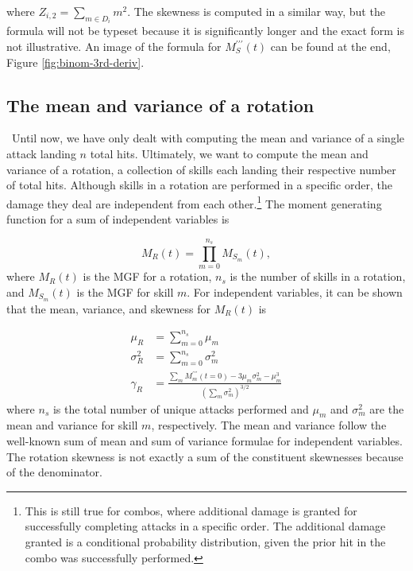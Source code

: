 \documentclass{article}
\begin{document}
        where $Z_{i,2} = \sum_{m \in D_{i}} m^2$. The skewness is computed in a similar way, but the formula will not be typeset because it is significantly longer and the exact form is not illustrative. An image of the formula for $M^{\prime\prime\prime}_S(t)$ can be found at the end, Figure \ref{fig:binom-3rd-deriv}.

        \subsection{The mean and variance of a rotation}\
        Until now, we have only dealt with computing the mean and variance of a single attack landing $n$ total hits. Ultimately, we want to compute the mean and variance of a rotation, a collection of skills each landing their respective number of total hits. Although skills in a rotation are performed in a specific order, the damage they deal are independent from each other.\footnote{This is still true for combos, where additional damage is granted for successfully completing attacks in a specific order. The additional damage granted is a conditional probability distribution, given the prior hit in the combo was successfully performed.} The moment generating function for a sum of independent variables is
        
        \begin{equation}
            M_R(t) = \prod_{m=0}^{n_s} M_{S_m}(t),
        \end{equation}
        where $M_R(t)$ is the MGF for a rotation, $n_s$ is the number of skills in a rotation, and $M_{S_m}(t)$ is the MGF for skill $m$. For independent variables, it can be shown that the mean, variance, and skewness for $M_R(t)$ is
        
        \begin{equation}\label{eqn:sum-of-stuff}
            \begin{split}
                \mu_R &= \sum_{m=0}^{n_s} \mu_m \\
                \sigma^2_R &= \sum_{m=0}^{n_s} \sigma_{m}^2 \\
                \gamma_R &= \frac{\sum_m M_m^{\prime\prime\prime}(t=0) - 3\mu_m \sigma_m^2 - \mu_m^3}
                {\left(\sum_m \sigma_{m}^2\right)^{3/2}} 
            \end{split}
        \end{equation}
        where $n_s$ is the total number of unique attacks performed and $\mu_m$ and $\sigma_m^2$ are the mean and variance for skill $m$, respectively. The mean and variance follow the well-known sum of mean and sum of variance formulae for independent variables. The rotation skewness is not exactly a sum of the constituent skewnesses because of the denominator.
\end{document}

